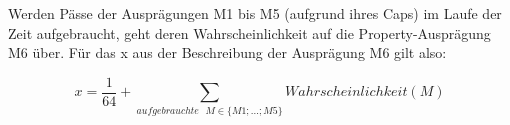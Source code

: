 \begin{NFT-Prop}
\vspace{0.2cm}

Werden Pässe der Ausprägungen M1 bis M5 (aufgrund ihres Caps) im Laufe der Zeit aufgebraucht, geht deren Wahrscheinlichkeit auf die Property-Ausprägung M6 über. Für das x aus der Beschreibung der Ausprägung M6 gilt also:

\vspace{0.2cm}

\begin{equation*}
x = \frac{1}{64} + \sum_{aufgebrauchte \textrm{ } M \in \lbrace M1;...;M5 \rbrace} Wahrscheinlichkeit(M)
\end{equation*}

\end{NFT-Prop}

\vspace{0.3cm}

